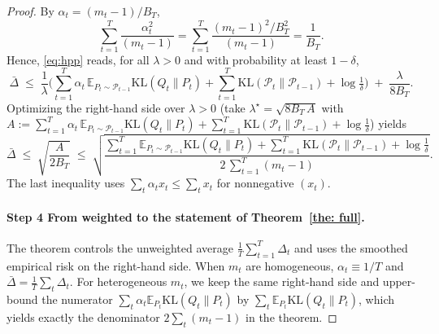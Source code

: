 \documentclass{article}
\theoremstyle{plain}
\theoremstyle{definition}
\theoremstyle{remark}
\begin{document}
\begin{proof}

By $\alpha_t=(m_t-1)/B_T$,
\[
\sum_{t=1}^T \frac{\alpha_t^2}{(m_t-1)}
=\sum_{t=1}^T \frac{(m_t-1)^2/B_T^2}{(m_t-1)}
=\frac{1}{B_T}.
\]
Hence, \eqref{eq:hpp} reads, for all $\lambda>0$ and with probability at least $1-\delta$,
\begin{equation}
\label{eq:gap-preopt}
\bar\Delta
\;\le\;
\frac{1}{\lambda}\Big(
\sum_{t=1}^T \alpha_t\,\mathbb E_{P_t\sim\mathcal P_{t-1}}\mathrm{KL}(Q_t\|P_t)
+ \sum_{t=1}^T \mathrm{KL}(\mathcal P_t\|\mathcal P_{t-1})
+ \log\tfrac1\delta\Big)
\;+\;
\frac{\lambda}{8B_T}.
\end{equation}
Optimizing the right-hand side over $\lambda>0$ (take $\lambda^\star=\sqrt{8B_T\,A}$ with
$A:=\sum_{t=1}^T \alpha_t\,\mathbb E_{P_t\sim\mathcal P_{t-1}}\mathrm{KL}(Q_t\|P_t)
+ \sum_{t=1}^T \mathrm{KL}(\mathcal P_t\|\mathcal P_{t-1}) + \log\tfrac1\delta$) yields
\begin{equation}
\label{eq:weighted-final}
\bar\Delta
\;\le\;
\sqrt{\frac{A}{2B_T}}
\;\le\;
\sqrt{\frac{
\sum_{t=1}^T \mathbb E_{P_t\sim\mathcal P_{t-1}}\mathrm{KL}(Q_t\|P_t)
+ \sum_{t=1}^T \mathrm{KL}(\mathcal P_t\|\mathcal P_{t-1})
+ \log\tfrac1\delta}{2\,\sum_{t=1}^T (m_t-1)}}.
\end{equation}
The last inequality uses $\sum_t \alpha_t x_t \le \sum_t x_t$ for nonnegative $(x_t)$.

\paragraph{Step 4 From weighted to the statement of Theorem~\ref{the: full}.}
The theorem controls the unweighted average $\frac1T\sum_{t=1}^T \Delta_t$ and uses the smoothed empirical risk on the right-hand side.
When $m_t$ are homogeneous, $\alpha_t\equiv 1/T$ and $\bar\Delta=\frac1T\sum_t\Delta_t$.
For heterogeneous $m_t$, we keep the same right-hand side and upper-bound the numerator $\sum_t \alpha_t \mathbb E_{P_t}\mathrm{KL}(Q_t\|P_t)$ by $\sum_t \mathbb E_{P_t}\mathrm{KL}(Q_t\|P_t)$, which yields exactly the denominator $2\sum_t(m_t-1)$ in the theorem.



\end{proof}
\end{document}
